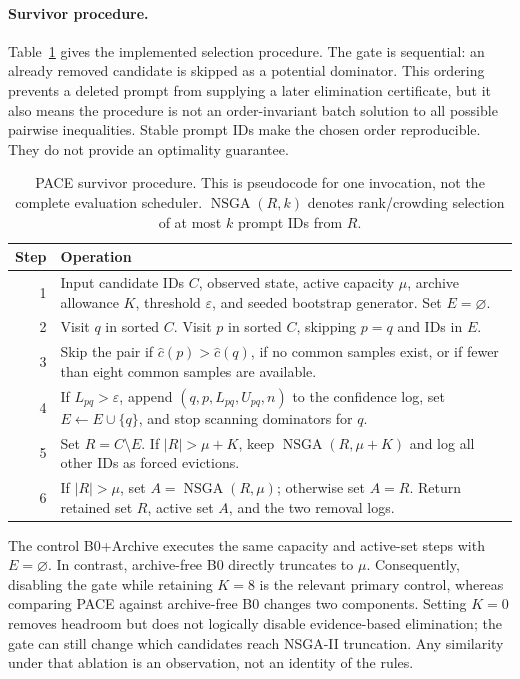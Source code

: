 \paragraph{Survivor procedure.}
Table~\ref{tab:algorithm} gives the implemented selection procedure. The gate is
sequential: an already removed candidate is skipped as a potential dominator.
This ordering prevents a deleted prompt from supplying a later elimination
certificate, but it also means the procedure is not an order-invariant batch
solution to all possible pairwise inequalities. Stable prompt IDs make the
chosen order reproducible. They do not provide an optimality guarantee.

\begin{table}[tbp]\centering\small
\caption{PACE survivor procedure. This is pseudocode for one invocation, not the
complete evaluation scheduler. $\operatorname{NSGA}(R,k)$ denotes rank/crowding
selection of at most $k$ prompt IDs from $R$.}
\label{tab:algorithm}
\begin{tabularx}{\linewidth}{@{}r>{\raggedright\arraybackslash}X@{}}\toprule
Step & Operation\\\midrule
1 & Input candidate IDs $C$, observed state, active capacity $\mu$, archive allowance
$K$, threshold $\varepsilon$, and seeded bootstrap generator. Set $E=\varnothing$.\\
2 & Visit $q$ in sorted $C$. Visit $p$ in sorted $C$, skipping $p=q$ and IDs in $E$.\\
3 & Skip the pair if $\widehat c(p)>\widehat c(q)$, if no common samples exist,
or if fewer than eight common samples are available.\\
4 & If $L_{pq}>\varepsilon$, append $(q,p,L_{pq},U_{pq},n)$ to the confidence log,
set $E\leftarrow E\cup\{q\}$, and stop scanning dominators for $q$.\\
5 & Set $R=C\setminus E$. If $|R|>\mu+K$, keep $\operatorname{NSGA}(R,\mu+K)$
and log all other IDs as forced evictions.\\
6 & If $|R|>\mu$, set $A=\operatorname{NSGA}(R,\mu)$; otherwise set $A=R$.
Return retained set $R$, active set $A$, and the two removal logs.\\\bottomrule
\end{tabularx}
\end{table}

The control B0+Archive executes the same capacity and active-set steps with
$E=\varnothing$. In contrast, archive-free B0 directly truncates to $\mu$.
Consequently, disabling the gate while retaining $K=8$ is the relevant primary
control, whereas comparing PACE against archive-free B0 changes two components.
Setting $K=0$ removes headroom but does not logically disable evidence-based
elimination; the gate can still change which candidates reach NSGA-II truncation.
Any similarity under that ablation is an observation, not an identity of the rules.

